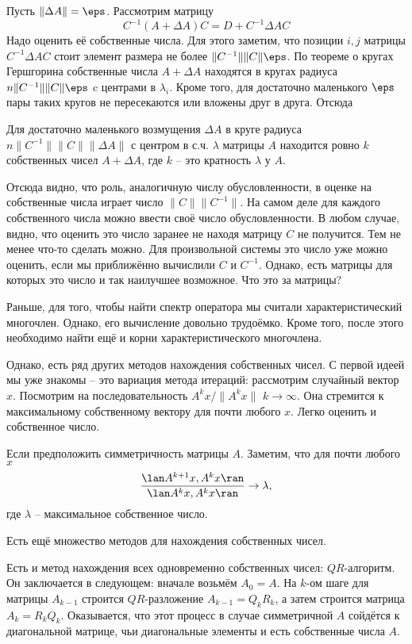 Пусть $\| \Delta A\|=\eps$. Рассмотрим матрицу
$$C^{-1}(A+\Delta A) C= D+C^{-1}\Delta A C $$
Надо оценить её собственные числа. Для этого заметим, что позиции  $i,j$ матрицы $C^{-1}\Delta A C$ стоит элемент размера не более $\| C^{-1}\| \|C\| \eps$. По теореме о кругах Гершгорина собственные числа $A+\Delta A$ находятся в кругах радиуса $n \| C^{-1}\| \|C\| \eps $ c центрами в $\lambda_i$. Кроме того, для достаточно маленького $\eps$ пары таких кругов не пересекаются или вложены друг в друга. Отсюда

\crl Для достаточно маленького возмущения $\Delta A$ в круге радиуса  $n \| C^{-1}\| \|C\| \|\Delta A\|$ с центром в с.ч.  $\lambda$ матрицы $A$ находится ровно $k$ собственных чисел $A+\Delta A$, где $k$ -- это кратность $\lambda$ у $A$.
\ecrl

Отсюда видно, что  роль, аналогичную числу обусловленности, в оценке на собственные числа играет число $\|C\|\|C^{-1}\|$. На самом деле для каждого собственного числа можно ввести своё число обусловленности. В любом случае, видно, что оценить это число заранее не находя матрицу $C$ не получится. Тем не менее что-то сделать можно. Для произвольной системы это число уже можно оценить, если мы приближённо вычислили $C$ и $C^{-1}$. Однако, есть матрицы для которых это число и так наилучшее возможное. Что это за матрицы?


Раньше, для того, чтобы найти спектр оператора мы считали характеристический многочлен. Однако, его вычисление довольно трудоёмко. Кроме того, после этого необходимо найти ещё и корни характеристического многочлена.


Однако, есть ряд других методов нахождения собственных чисел. С первой идеей мы уже знакомы -- это вариация метода итераций: рассмотрим случайный вектор $x$. Посмотрим на последовательность $A^kx/\|A^kx\|$ $k\to \infty$. Она стремится к максимальному собственному вектору для почти любого $x$. Легко оценить и собственное число.

Если предположить симметричность матрицы $A$. Заметим, что  для почти любого $x$ 
$$\frac {\lan A^{k+1}x, A^k x \ran}{\lan A^k x, A^k x \ran} \to \lambda, $$
где $\lambda$ -- максимальное собственное число.

Есть ещё множество методов для нахождения собственных чисел. 

Есть и метод нахождения всех одновременно собственных чисел: $QR$-алгоритм. Он заключается в следующем: вначале возьмём $A_0=A$. На $k$-ом шаге для матрицы $A_{k-1}$ строится $QR$-разложение $A_{k-1}=Q_kR_k$, а затем строится матрица $A_k=R_kQ_k$. Оказывается, что этот процесс в случае симметричной $A$ сойдётся к диагональной матрице, чьи диагональные элементы  и есть собственные числа $A$. 

